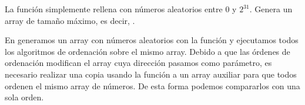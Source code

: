 
La función  simplemente rellena  con números aleatorios entre 0 y \(2^{31}\). Genera un array de tamaño máximo, es decir, .


En  generamos un array con números aleatorios con la función  y ejecutamos todos los algoritmos de ordenación sobre el mismo array. Debido a que las órdenes de ordenación modifican el array cuya dirección pasamos como parámetro, es necesario realizar una copia usando la función  a un array auxiliar para que todos ordenen el mismo array de números. De esta forma podemos compararlos con una sola orden.


